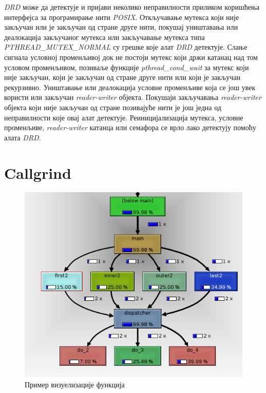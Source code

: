 \documentclass[12pt,oneside]{memoir}
\begin{document}
\indent \textit{DRD} може да детектује и пријави неколико неправилности приликом коришћења интерфејса за програмирање нити  \textit{POSIX}. Откључавање мутекса који није закључан или је закључан од стране друге нити, покушај уништавања или деалокација закључаног мутекса или закључавање мутекса типа  \textit{PTHREAD\_\-MUTEX\_NORMAL} су грешке које алат \textit{DRD} детектује. Слање сигнала условној променљивој док не постоји мутекс који држи катанац над том условом променљивом, позиваље функције \textit{pthread\_cond\_wait} за мутекс који није закључан, који је закључан од стране друге нити или који је закључан рекурзивно. Уништавање или деалокација условне променљиве која се још увек користи или закључан \textit{reader-writer} објекта. Покушаји закључавања \textit{reader-writer} објекта који није закључан од стране позивајуће нити је још једна од неправилности које овај алат детектује. Реиницијализација мутекса, условне променљиве, \textit{reader-writer} катанца или семафора се врло лако детектују помоћу алата \textit{DRD}.


\section{Callgrind}
\label{section_callgrind}

\begin{figure}[h!]
\begin{center}
\includegraphics[scale=0.75]{slika18.png}
\end{center}
\caption{Пример визуелизације функција}
\label{fig:callgrind}
\end{figure}
\end{document}
